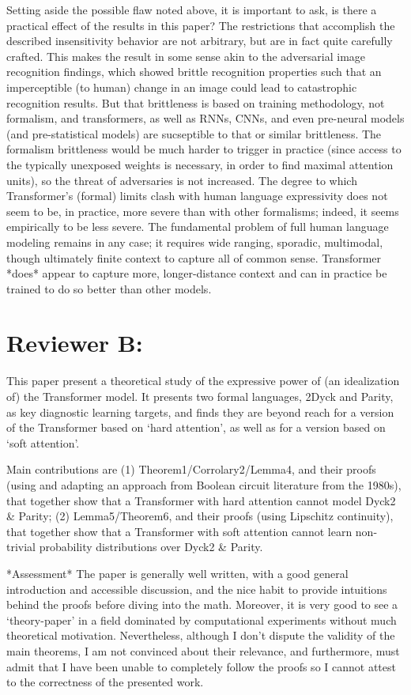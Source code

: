 \documentclass[11pt,a4paper]{article}
\newcounter{theorem}
\begin{document}
Setting aside the possible flaw noted above, it is important to ask, is
there a practical effect of the results in this paper? The
restrictions that accomplish the described insensitivity behavior are
not arbitrary, but are in fact quite carefully crafted. This makes the
result in some sense akin to the adversarial image recognition
findings, which showed brittle recognition properties such that an
imperceptible (to human) change in an image could lead to
catastrophic recognition results. But that brittleness is based on
training methodology, not formalism, and transformers, as well as
RNNs, CNNs, and even pre-neural models (and pre-statistical models)
are sucseptible to that or similar brittleness. The formalism
brittleness would be much harder to trigger in practice (since access
to the typically unexposed weights is necessary, in order to find
maximal attention units), so the threat
of adversaries is not increased. The degree to which Transformer's
(formal) limits clash with human language expressivity does not seem
to be, in practice, more severe than with other formalisms; indeed, it
seems empirically to be less severe. The fundamental problem of full
human language modeling remains in any case; it requires wide ranging,
sporadic, multimodal, though ultimately finite context to capture all
of common sense. Transformer *does* appear to capture more,
longer-distance context and can in practice be trained to do so better
than other models.

\section{Reviewer B:}

This paper present a theoretical study of the expressive power of (an
idealization of) the Transformer model. It presents two formal languages,
2Dyck and Parity, as key diagnostic learning targets, and finds they are
beyond reach for a version of the Transformer based on ‘hard attention’,
as well as for a version based on ‘soft attention’.

Main contributions are (1) Theorem1/Corrolary2/Lemma4, and their proofs
(using and adapting an approach from Boolean circuit literature from the
1980s), that together show that a Transformer with hard attention cannot
model Dyck2 & Parity; (2) Lemma5/Theorem6, and their proofs (using Lipschitz
continuity), that together show that a Transformer with soft attention
cannot learn non-trivial probability distributions over Dyck2 & Parity.

*Assessment*
The paper is generally well written, with a good general introduction and
accessible discussion, and the nice habit to provide intuitions behind the
proofs before diving into the math. Moreover, it is very good to see a
‘theory-paper’ in a field dominated by computational experiments without
much theoretical motivation. Nevertheless, although I don’t dispute the
validity of the main theorems, I am not convinced about their relevance, and
furthermore, must admit that I have been unable to completely follow the
proofs so I cannot attest to the correctness of the presented work.
\end{document}

